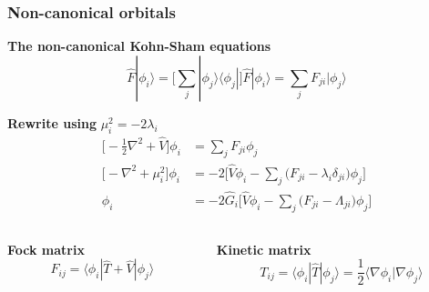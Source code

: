 \documentclass[mathserif, 10pt]{beamer}
\begin{document}
\begin{frame}
    \frametitle{Non-canonical orbitals}
    \centering
    \textbf{The non-canonical Kohn-Sham equations}
    \begin{equation}
        \nonumber
        \hat{F}|\phi_i\rangle 
        = \bigg[\sum_j|\phi_j\rangle\langle\phi_j|\bigg]\hat{F}|\phi_i\rangle
        = \sum_jF_{ji}|\phi_j\rangle
    \end{equation}

    \vspace{5mm}

    \textbf{Rewrite using} $\mu_i^2 = -2\lambda_i$
    \begin{align}
        \nonumber
        \bigg[-\frac{1}{2}\nabla^2 + \hat{V}\bigg]\phi_i
        &= \sum_jF_{ji}\phi_j\\
        \nonumber
        \bigg[-\nabla^2 + \mu_i^2\bigg]\phi_i 
        &= -2\bigg[\hat{V}\phi_i - \sum_j\big(F_{ji} -
        \lambda_i\delta_{ji}\big)\phi_j\bigg]\\
        \nonumber
        \phi_i
        &= -2\hat{G}_i\bigg[\hat{V}\phi_i - \sum_j\big(F_{ji} -
        \Lambda_{ji}\big)\phi_j\bigg]
    \end{align}

    \vspace{5mm}

    \begin{columns}
    \begin{column}[b]{0.48\linewidth}
    \centering
    \textbf{Fock matrix}
    \begin{equation}
        \nonumber
        F_{ij} = \langle\phi_i|\hat{T} + \hat{V}|\phi_j\rangle
    \end{equation}
    \end{column}

    \begin{column}[b]{0.48\linewidth}
    \centering
    \textbf{Kinetic matrix}
    \begin{equation}
        \nonumber
        T_{ij}
        = \langle\phi_i|\hat{T}|\phi_j\rangle
        = \frac{1}{2}\langle\nabla\phi_i|\nabla\phi_j\rangle
    \end{equation}
    \end{column}
    \end{columns}
\end{frame}
\end{document}
